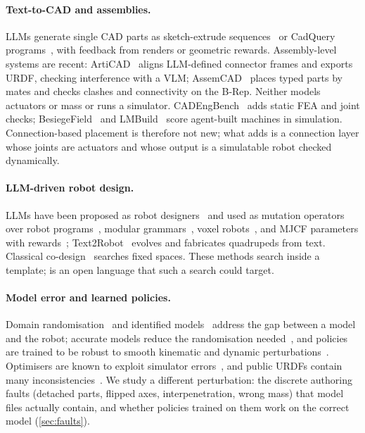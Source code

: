 \paragraph{Text-to-CAD and assemblies.}
LLMs generate single CAD parts as sketch-extrude sequences~\citep{khan2024text2cad} or CadQuery
programs~\citep{alrashedy2025cadcodeverify,rukhovich2025cadrecode,guan2025cadcoder,kolodiazhnyi2026cadrille,mallis2025cadassistant},
with feedback from renders or geometric rewards. Assembly-level systems are recent:
ArtiCAD~\citep{shui2026articad} aligns LLM-defined connector frames and exports URDF, checking
interference with a VLM; AssemCAD~\citep{dong2026assemcad} places typed parts by mates and checks
clashes and connectivity on the B-Rep. Neither models actuators or mass or runs a simulator.
CADEngBench~\citep{singh2026cadengbench} adds static FEA and joint checks; BesiegeField~\citep{zhang2026besiegefield}
and LMBuild~\citep{liu2026lmbuild} score agent-built machines in simulation. Connection-based
placement is therefore not new; what \ms adds is a connection layer whose joints are actuators and
whose output is a simulatable robot checked dynamically.

\paragraph{LLM-driven robot design.}
LLMs have been proposed as robot designers~\citep{stella2023llmdesign} and used as mutation
operators over robot programs~\citep{lehman2022elm}, modular grammars~\citep{qiu2026robomorph},
voxel robots~\citep{song2025laser}, and MJCF parameters with rewards~\citep{fang2025robomore,qiu2025debate2create};
Text2Robot~\citep{ringel2025text2robot} evolves and fabricates quadrupeds from text. Classical
co-design~\citep{sims1994evolving,bhatia2021evogym,yuan2022transform2act} searches fixed spaces.
These methods search inside a template; \ms is an open language that such a search could target.

\paragraph{Model error and learned policies.}
Domain randomisation~\citep{peng2018dynrand} and identified models~\citep{tan2018simtoreal,hwangbo2019anymal,bjelonic2026bridging}
address the gap between a model and the robot; accurate models reduce the randomisation
needed~\citep{xie2021dynrandrevisited}, and policies are trained to be robust to smooth kinematic
and dynamic perturbations~\citep{exarchos2021kinematic,campanaro2024erfi,mankowitz2020robust}.
Optimisers are known to exploit simulator errors~\citep{lehman2020creativity}, and public URDFs
contain many inconsistencies~\citep{tola2024urdf}. We study a different perturbation: the discrete
authoring faults (detached parts, flipped axes, interpenetration, wrong mass) that model files
actually contain, and whether policies trained on them work on the correct model
(\cref{sec:faults}).

